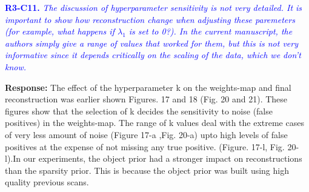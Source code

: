 \documentclass{article}
\begin{document}
\textcolor{blue}{\textbf{R3-C11.}\textit{ The discussion of hyperparameter sensitivity is not very detailed. It is important to show how reconstruction change when adjusting these paremeters (for example, what happens if $\lambda_1$ is set to 0?). In the current manuscript, the authors simply give a range of values that worked for them, but this is not very informative since it depends critically on the scaling of the data, which we don't know.}}

\textbf{Response:} The effect of the hyperparameter k on the weights-map and final reconstruction was earlier shown Figures. 17 and 18 (Fig. 20 and 21). These figures show that the selection of k decides the sensitivity to noise (false positives) in the weights-map. The range of k values deal with the extreme cases of very less amount of noise (Figure 17-a ,Fig. 20-a) upto high levels of false positives at the expense of not missing any true positive. (Figure. 17-l, Fig. 20-l).In our experiments, the object prior had a stronger impact on reconstructions than the sparsity prior. This is because the object prior was built using high quality previous scans. 
\end{document}
